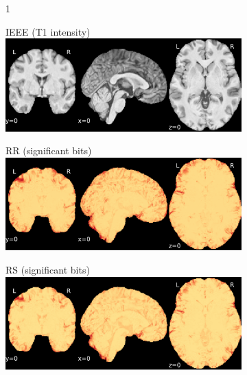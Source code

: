 \documentclass{article}
\begin{document}
\begin{appendices}
    \begin{landscape}
        \begin{figure}

            \vspace*{-2cm}
            \centering
            \begin{subfigure}[b][][c]{0.01\paperwidth} 1 \vspace*{-45pt} \end{subfigure}
            \begin{subfigure}[t]{0.2\paperheight}
                \centering
                IEEE (T1 intensity)
                \includegraphics[width=\textwidth]{figures/sig/0mm/ieee_ds001600_sub-1.pdf}
            \end{subfigure}
            \begin{subfigure}[t]{0.2\paperheight}
                \centering
                RR (significant bits)
                \includegraphics[width=\textwidth]{figures/sig/0mm/rr_ds001600_sub-1_sig.pdf}
            \end{subfigure}
            \begin{subfigure}[t]{0.2\paperheight}
                \centering
                RS (significant bits)
                \includegraphics[width=\textwidth]{figures/sig/0mm/rs_ds001600_sub-1_sig.pdf}

\end{subfigure}
\end{figure}
\end{landscape}
\end{appendices}
\end{document}
